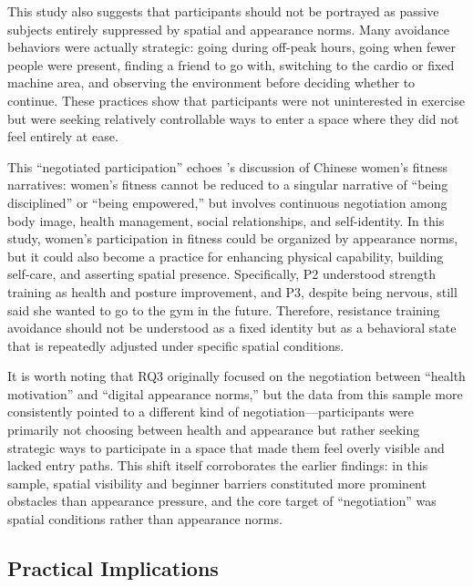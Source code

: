 This study also suggests that participants should not be portrayed as passive subjects entirely suppressed by spatial and appearance norms.
Many avoidance behaviors were actually strategic: going during off-peak hours, going when fewer people were present, finding a friend to go with, switching to the cardio or fixed machine area, and observing the environment before deciding whether to continue.
These practices show that participants were not uninterested in exercise but were seeking relatively controllable ways to enter a space where they did not feel entirely at ease.

This ``negotiated participation'' echoes \textcite{xiong2021fanshen}'s discussion of Chinese women's fitness narratives: women's fitness cannot be reduced to a singular narrative of ``being disciplined'' or ``being empowered,'' but involves continuous negotiation among body image, health management, social relationships, and self-identity.
In this study, women's participation in fitness could be organized by appearance norms, but it could also become a practice for enhancing physical capability, building self-care, and asserting spatial presence.
Specifically, P2 understood strength training as health and posture improvement, and P3, despite being nervous, still said she wanted to go to the gym in the future.
Therefore, resistance training avoidance should not be understood as a fixed identity but as a behavioral state that is repeatedly adjusted under specific spatial conditions.

It is worth noting that RQ3 originally focused on the negotiation between ``health motivation'' and ``digital appearance norms,'' but the data from this sample more consistently pointed to a different kind of negotiation---participants were primarily not choosing between health and appearance but rather seeking strategic ways to participate in a space that made them feel overly visible and lacked entry paths.
This shift itself corroborates the earlier findings: in this sample, spatial visibility and beginner barriers constituted more prominent obstacles than appearance pressure, and the core target of ``negotiation'' was spatial conditions rather than appearance norms.

\subsection{Practical Implications}

